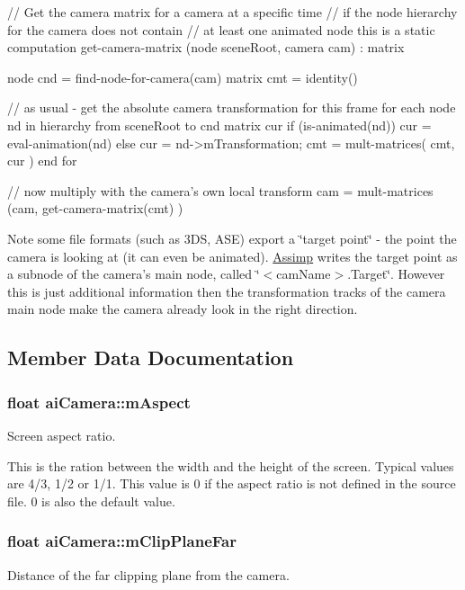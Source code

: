 \begin{DoxyCode}
 // Get the camera matrix for a camera at a specific time
 // if the node hierarchy for the camera does not contain
 // at least one animated node this is a static computation
 get-camera-matrix (node sceneRoot, camera cam) : matrix
 {
    node   cnd = find-node-for-camera(cam)
    matrix cmt = identity()

    // as usual - get the absolute camera transformation for this frame
    for each node nd in hierarchy from sceneRoot to cnd
      matrix cur
      if (is-animated(nd))
         cur = eval-animation(nd)
      else cur = nd->mTransformation;
      cmt = mult-matrices( cmt, cur )
    end for

    // now multiply with the camera's own local transform
    cam = mult-matrices (cam, get-camera-matrix(cmt) )
 }
\end{DoxyCode}


\begin{DoxyNote}{\-Note}
some file formats (such as 3\-D\-S, \-A\-S\-E) export a \char`\"{}target point\char`\"{} -\/ the point the camera is looking at (it can even be animated). \hyperlink{namespaceAssimp}{\-Assimp} writes the target point as a subnode of the camera's main node, called \char`\"{}$<$cam\-Name$>$.\-Target\char`\"{}. \-However this is just additional information then the transformation tracks of the camera main node make the camera already look in the right direction. 
\end{DoxyNote}


\subsection{\-Member \-Data \-Documentation}
\hypertarget{structaiCamera_ae414556eaa6f910b5927f465d97bf70c}{
\subsubsection[{m\-Aspect}]{\setlength{\rightskip}{0pt plus 5cm}float {\bf ai\-Camera\-::m\-Aspect}}}\label{structaiCamera_ae414556eaa6f910b5927f465d97bf70c}
\-Screen aspect ratio.

\-This is the ration between the width and the height of the screen. \-Typical values are 4/3, 1/2 or 1/1. \-This value is 0 if the aspect ratio is not defined in the source file. 0 is also the default value. \hypertarget{structaiCamera_aa9ccf77e3d7ca3dc8f46df931b65172f}{
\subsubsection[{m\-Clip\-Plane\-Far}]{\setlength{\rightskip}{0pt plus 5cm}float {\bf ai\-Camera\-::m\-Clip\-Plane\-Far}}}\label{structaiCamera_aa9ccf77e3d7ca3dc8f46df931b65172f}
\-Distance of the far clipping plane from the camera.

